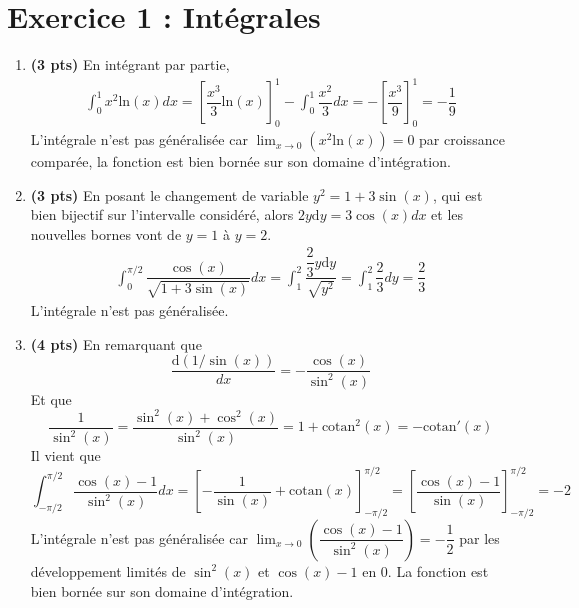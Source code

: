 \documentclass[fleqn]{article}
\begin{document}

\section{Exercice 1 : Intégrales }


\begin{enumerate}
   \item \textbf{(3 pts)} En intégrant par partie,
   \begin{align*}
   \int_0^1 x^2 \mathrm{ln}(x) dx = \left[\dfrac{x^3}{3} \mathrm{ln}(x)\right]_0^1 - \int_0^1 \dfrac{x^2}{3}dx   =-\left[\dfrac{x^3}{9}\right]_0^1 =-\dfrac{1}{9}
   \end{align*}
   L'intégrale n'est pas généralisée car $\lim_{x \to 0} \left(x^2 \mathrm{ln}(x)\right)= 0$ par croissance comparée, la fonction est bien bornée sur son domaine d'intégration.
   \item \textbf{(3 pts)} En posant le changement de variable $y^2=1+3\sin(x)$, qui est bien bijectif sur l'intervalle considéré, alors $2y\mathrm{d}y=3\cos(x)dx$ et les nouvelles bornes vont de $y=1$ à $y=2$.
   \begin{align*}
   \int_0^{\pi/2} \dfrac{\cos(x)}{\sqrt{1+3\sin(x)}}dx = \int_1^2 \dfrac{\dfrac{2}{3}y\mathrm{d}y}{\sqrt{y^2}}=\int_1^2 \dfrac{2}{3}dy=\dfrac{2}{3}
   \end{align*}
   L'intégrale n'est pas généralisée.
   \item \textbf{(4 pts)} En remarquant que $$\dfrac{\mathrm{d}(1/\sin(x))}{dx}=-\dfrac{\cos(x)}{\sin^2(x)}$$
   Et que $$ \dfrac{1}{\sin^2(x)}=\dfrac{\sin^2(x)+\cos^2(x)}{\sin^2(x)}=1+\mathrm{cotan}^2(x)=-\mathrm{cotan}'(x)$$
   Il vient que $$\int_{-\pi/2}^{\pi/2} \dfrac{\cos(x)-1}{\sin^2(x)}dx = \left[-\dfrac{1}{\sin(x)}+\mathrm{cotan}(x)\right]_{-\pi/2}^{\pi/2} =\left[\dfrac{\cos(x)-1}{\sin(x)}\right]_{-\pi/2}^{\pi/2}=-2$$
   L'intégrale n'est pas généralisée car $\lim_{x \to 0}\left(\dfrac{\cos(x)-1}{\sin^2(x)}\right)=-\dfrac{1}{2}$ par les développement limités de $\sin^2(x)$ et $\cos(x) -1$ en $0$. La fonction est bien bornée sur son domaine d'intégration.
\end{enumerate}
\end{document}
